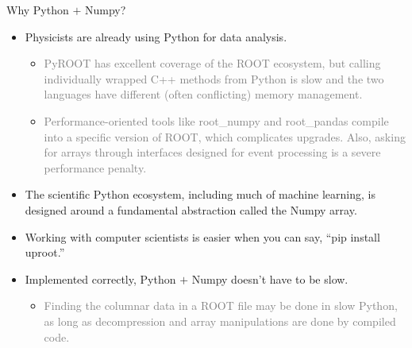 \documentclass[aspectratio=169]{beamer}
\begin{document}
\begin{frame}{Why Python $+$ Numpy?}
\vspace{0.25 cm}
\begin{itemize}\setlength{\itemsep}{0.35 cm}
\item Physicists are already using Python for data analysis.

\begin{itemize}
\item \textcolor{gray}{PyROOT has excellent coverage of the ROOT ecosystem, but calling individually wrapped C++ methods from Python is slow and the two languages have different (often conflicting) memory management.}

\item \textcolor{gray}{Performance-oriented tools like root\_numpy and root\_pandas compile into a specific version of ROOT, which complicates upgrades. Also, asking for arrays through interfaces designed for event processing is a severe performance penalty.}
\end{itemize}

\item The scientific Python ecosystem, including much of machine learning, is designed around a fundamental abstraction called the Numpy array.

\item Working with computer scientists is easier when you can say, ``pip install uproot.''

\item Implemented correctly, Python $+$ Numpy doesn't have to be slow.

\begin{itemize}
\item \textcolor{gray}{Finding the columnar data in a ROOT file may be done in slow Python, as long as decompression and array manipulations are done by compiled code.}
\end{itemize}
\end{itemize}
\end{frame}


\end{document}
